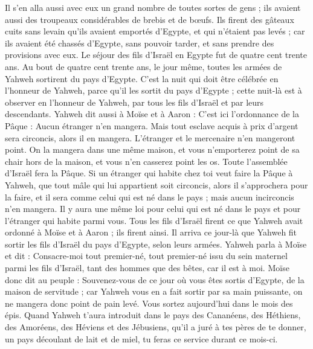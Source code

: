 \begin{multicols}{2}
Il s'en alla aussi avec eux un grand nombre de toutes sortes de gens ; ils avaient aussi des troupeaux considérables de brebis et de bœufs.
Ils firent des gâteaux cuits sans levain qu’ils avaient emportés d’Egypte, et qui n’étaient pas levés ; car ils avaient été chassés d’Egypte, sans pouvoir tarder, et sans prendre des provisions avec eux.
Le séjour des fils d'Israël en Egypte fut de quatre cent trente ans.
Au bout de quatre cent trente ans, le jour même, toutes les armées de Yahweh sortirent du pays d'Egypte.
C'est la nuit qui doit être célébrée en l'honneur de Yahweh, parce qu'il les sortit du pays d'Egypte ; cette nuit-là est à observer en l'honneur de Yahweh, par tous les fils d'Israël et par leurs descendants.
Yahweh dit aussi à Moïse et à Aaron : C'est ici l'ordonnance de la Pâque : Aucun étranger n'en mangera.
Mais tout esclave acquis à prix d’argent sera circoncis, alors il en mangera.
L'étranger et le mercenaire n'en mangeront point.
On la mangera dans une même maison, et vous n'emporterez point de sa chair hors de la maison, et vous n'en casserez point les os.
Toute l'assemblée d'Israël fera la Pâque.
Si un étranger qui habite chez toi veut faire la Pâque à Yahweh, que tout mâle qui lui appartient soit circoncis, alors il s'approchera pour la faire, et il sera comme celui qui est né dans le pays ; mais aucun incirconcis n'en mangera.
Il y aura une même loi pour celui qui est né dans le pays et pour l'étranger qui habite parmi vous.
Tous les fils d'Israël firent ce que Yahweh avait ordonné à Moïse et à Aaron ; ils firent ainsi.
Il arriva ce jour-là que Yahweh fit sortir les fils d'Israël du pays d'Egypte, selon leurs armées.
\VerseOne{}Yahweh parla à Moïse et dit :
Consacre-moi tout premier-né, tout premier-né issu du sein maternel parmi les fils d'Israël, tant des hommes que des bêtes, car il est à moi.
Moïse donc dit au peuple : Souvenez-vous de ce jour où vous êtes sortis d'Egypte, de la maison de servitude ; car Yahweh vous en a fait sortir par sa main puissante, on ne mangera donc point de pain levé.
Vous sortez aujourd'hui dans le mois des épis.
Quand Yahweh t'aura introduit dans le pays des Cananéens, des Héthiens, des Amoréens, des Héviens et des Jébusiens, qu’il a juré à tes pères de te donner, un pays découlant de lait et de miel, tu feras ce service durant ce mois-ci.

\end{multicols}
